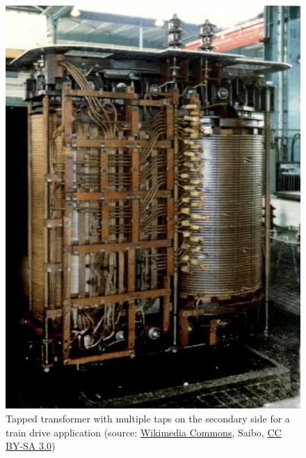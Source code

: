 \begin{frame}
\begin{columns}[b]
\begin{column}{0.55\textwidth}
\begin{figure}
				\includegraphics[height=0.6\textheight]{fig/lec04/Taped_transformer_train_example.jpg}
				\caption{Tapped transformer with multiple taps on the secondary side for a train drive application (source: \href{https://de.wikipedia.org/wiki/Datei:TrafoAW-2.jpg}{Wikimedia Commons}, Saibo, \href{https://creativecommons.org/licenses/by-sa/3.0/deed.en}{CC BY-SA 3.0})}
				\label{fig:Taped_transformer_train_example}
			\end{figure}
		\end{column}
	\end{columns}
\end{frame}

